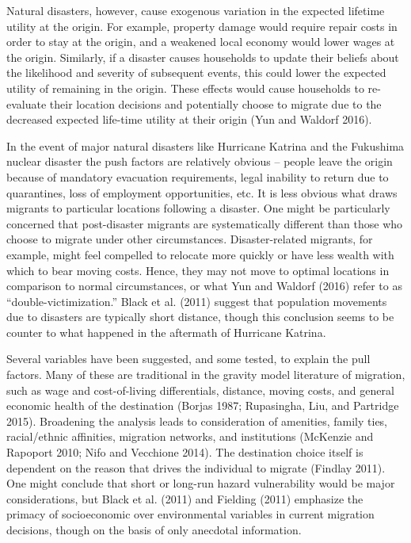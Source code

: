 \documentclass[]{article}
\begin{document}
Natural disasters, however, cause exogenous variation in the expected
lifetime utility at the origin. For example, property damage would
require repair costs in order to stay at the origin, and a weakened
local economy would lower wages at the origin. Similarly, if a disaster
causes households to update their beliefs about the likelihood and
severity of subsequent events, this could lower the expected utility of
remaining in the origin. These effects would cause households to
re-evaluate their location decisions and potentially choose to migrate
due to the decreased expected life-time utility at their origin (Yun and
Waldorf 2016).

In the event of major natural disasters like Hurricane Katrina and the
Fukushima nuclear disaster the push factors are relatively obvious --
people leave the origin because of mandatory evacuation requirements,
legal inability to return due to quarantines, loss of employment
opportunities, etc. It is less obvious what draws migrants to particular
locations following a disaster. One might be particularly concerned that
post-disaster migrants are systematically different than those who
choose to migrate under other circumstances. Disaster-related migrants,
for example, might feel compelled to relocate more quickly or have less
wealth with which to bear moving costs. Hence, they may not move to
optimal locations in comparison to normal circumstances, or what Yun and
Waldorf (2016) refer to as ``double-victimization.'' Black et al. (2011)
suggest that population movements due to disasters are typically short
distance, though this conclusion seems to be counter to what happened in
the aftermath of Hurricane Katrina.

Several variables have been suggested, and some tested, to explain the
pull factors. Many of these are traditional in the gravity model
literature of migration, such as wage and cost-of-living differentials,
distance, moving costs, and general economic health of the destination
(Borjas 1987; Rupasingha, Liu, and Partridge 2015). Broadening the
analysis leads to consideration of amenities, family ties, racial/ethnic
affinities, migration networks, and institutions (McKenzie and Rapoport
2010; Nifo and Vecchione 2014). The destination choice itself is
dependent on the reason that drives the individual to migrate (Findlay
2011). One might conclude that short or long-run hazard vulnerability
would be major considerations, but Black et al. (2011) and Fielding
(2011) emphasize the primacy of socioeconomic over environmental
variables in current migration decisions, though on the basis of only
anecdotal information.
\end{document}
